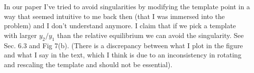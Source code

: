 \begin{description}
In our paper  I've tried to avoid singularities by modifying the
template point in a way that seemed intuitive to me back then (that I was immersed
into the problem) and I don't understand anymore. I claim that if we pick a template 
with larger $y_2/y_1$ than the relative equilibrium we can avoid 
the singularity. See Sec. 6.3 and Fig 7(b).
(There is a discrepancy between what I plot in the figure and what I say in the
text, which I think is due to an inconsistency in rotating and rescaling the 
template and should not be essential).


\end{description}
